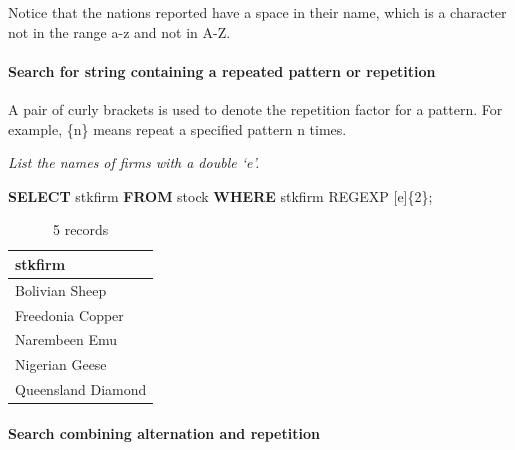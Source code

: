\documentclass[
]{article}
\newenvironment{Shaded}{\begin{snugshade}}{\end{snugshade}}
\newcommand{\KeywordTok}[1]{\textcolor[rgb]{0.13,0.29,0.53}{\textbf{#1}}}
\newcommand{\NormalTok}[1]{#1}
\newcommand{\StringTok}[1]{\textcolor[rgb]{0.31,0.60,0.02}{#1}}
\begin{document}
Notice that the nations reported have a space in their name, which is a
character not in the range a-z and not in A-Z.

\hypertarget{search-for-string-containing-a-repeated-pattern-or-repetition}{%
\paragraph*{Search for string containing a repeated pattern or repetition}\label{search-for-string-containing-a-repeated-pattern-or-repetition}}

A pair of curly brackets is used to denote the repetition factor for a
pattern. For example, \{n\} means repeat a specified pattern n times.

\emph{List the names of firms with a double `e'.}

\begin{Shaded}
\begin{Highlighting}[]
\KeywordTok{SELECT}\NormalTok{ stkfirm }\KeywordTok{FROM}\NormalTok{ stock }\KeywordTok{WHERE}\NormalTok{ stkfirm REGEXP }\StringTok{\textquotesingle{}[e]\{2\}\textquotesingle{}}\NormalTok{;}
\end{Highlighting}
\end{Shaded}

\begin{table}

\caption{\label{tab:unnamed-chunk-48}5 records}
\centering
\begin{tabular}[t]{l}
\hline
stkfirm\\
\hline
Bolivian Sheep\\
\hline
Freedonia Copper\\
\hline
Narembeen Emu\\
\hline
Nigerian Geese\\
\hline
Queensland Diamond\\
\hline
\end{tabular}
\end{table}

\hypertarget{search-combining-alternation-and-repetition}{%
\paragraph*{Search combining alternation and repetition}\label{search-combining-alternation-and-repetition}}
\end{document}
